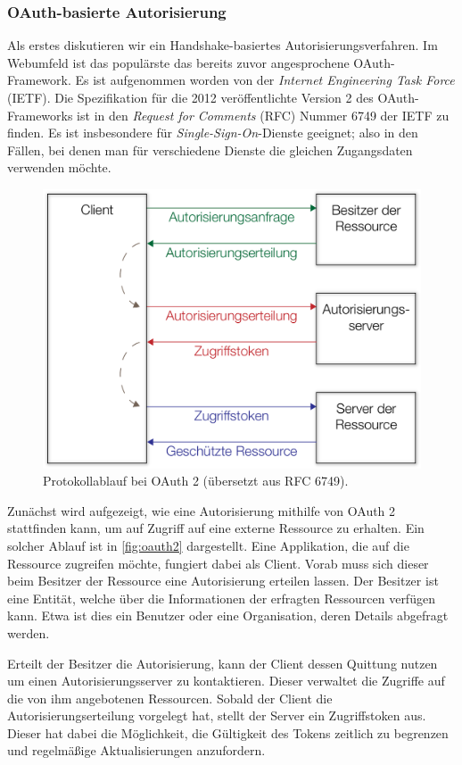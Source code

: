 \subsubsection{OAuth-basierte Autorisierung}

Als erstes diskutieren wir ein Handshake-basiertes Autorisierungsverfahren. Im Webumfeld ist das populärste das bereits zuvor angesprochene OAuth-Framework. Es ist aufgenommen worden von der \textit{Internet Engineering Task Force} (IETF). Die Spezifikation für die 2012 veröffentlichte Version 2 des OAuth-Frameworks ist in den \textit{Request for Comments} (RFC) Nummer 6749 der IETF zu finden. Es ist insbesondere für \textit{Single-Sign-On}-Dienste geeignet; also in den Fällen, bei denen man für verschiedene Dienste die gleichen Zugangsdaten verwenden möchte. \cite{RFC6749}

\begin{figure}[h]
	\centering
	\includegraphics[width=.52\linewidth]{img/OAuth2}
	\caption{Protokollablauf bei OAuth 2 (übersetzt aus RFC 6749).}
	\label{fig:oauth2}
\end{figure}

Zunächst wird aufgezeigt, wie eine Autorisierung mithilfe von OAuth 2 stattfinden kann, um auf Zugriff auf eine externe Ressource zu erhalten. Ein solcher Ablauf ist in \autoref{fig:oauth2} dargestellt. Eine Applikation, die auf die Ressource zugreifen möchte, fungiert dabei als Client. Vorab muss sich dieser beim Besitzer der Ressource eine Autorisierung erteilen lassen. Der Besitzer ist eine Entität, welche über die Informationen der erfragten Ressourcen verfügen kann. Etwa ist dies ein Benutzer oder eine Organisation, deren Details abgefragt werden.

Erteilt der Besitzer die Autorisierung, kann der Client dessen Quittung nutzen um einen Autorisierungsserver zu kontaktieren. Dieser verwaltet die Zugriffe auf die von ihm angebotenen Ressourcen. Sobald der Client die Autorisierungserteilung vorgelegt hat, stellt der Server ein Zugriffstoken aus. Dieser hat dabei die Möglichkeit, die Gültigkeit des Tokens zeitlich zu begrenzen und regelmäßige Aktualisierungen anzufordern. 

